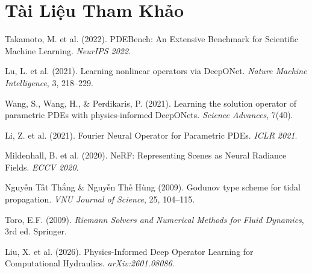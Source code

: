 \documentclass[12pt,a4paper]{article}
\begin{document}
\section*{Tài Liệu Tham Khảo}

\begin{enumerate}[label={[\arabic*]}, nosep]
  \item Takamoto, M. et al. (2022). PDEBench: An Extensive Benchmark for Scientific Machine Learning. \textit{NeurIPS 2022}.
  \item Lu, L. et al. (2021). Learning nonlinear operators via DeepONet. \textit{Nature Machine Intelligence}, 3, 218--229.
  \item Wang, S., Wang, H., \& Perdikaris, P. (2021). Learning the solution operator of parametric PDEs with physics-informed DeepONets. \textit{Science Advances}, 7(40).
  \item Li, Z. et al. (2021). Fourier Neural Operator for Parametric PDEs. \textit{ICLR 2021}.
  \item Mildenhall, B. et al. (2020). NeRF: Representing Scenes as Neural Radiance Fields. \textit{ECCV 2020}.
  \item Nguyễn Tất Thắng \& Nguyễn Thế Hùng (2009). Godunov type scheme for tidal propagation. \textit{VNU Journal of Science}, 25, 104--115.
  \item Toro, E.F. (2009). \textit{Riemann Solvers and Numerical Methods for Fluid Dynamics}, 3rd ed. Springer.
  \item Liu, X. et al. (2026). Physics-Informed Deep Operator Learning for Computational Hydraulics. \textit{arXiv:2601.08086}.
\end{enumerate}
\end{document}
